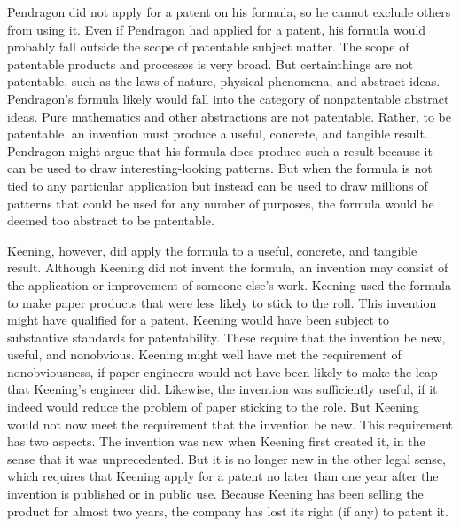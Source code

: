 \documentclass[
  ignorenonframetext,
  aspectratio=169]{beamer}
\begin{document}
\begin{frame}{}
\protect\hypertarget{section-12}{}
Pendragon did not apply for a patent on his formula, so he cannot
exclude others from using it. Even if Pendragon had applied for a
patent, his formula would probably fall outside the scope of patentable
subject matter. The scope of patentable products and processes is very
broad. But certainthings are not patentable, such as the laws of nature,
physical phenomena, and abstract ideas. Pendragon's formula likely would
fall into the category of nonpatentable abstract ideas. Pure mathematics
and other abstractions are not patentable. Rather, to be patentable, an
invention must produce a useful, concrete, and tangible result.
Pendragon might argue that his formula does produce such a result
because it can be used to draw interesting-looking patterns. But when
the formula is not tied to any particular application but instead can be
used to draw millions of patterns that could be used for any number of
purposes, the formula would be deemed too abstract to be patentable.
\end{frame}

\begin{frame}{}
\protect\hypertarget{section-13}{}
Keening, however, did apply the formula to a useful, concrete, and
tangible result. Although Keening did not invent the formula, an
invention may consist of the application or improvement of someone
else's work. Keening used the formula to make paper products that were
less likely to stick to the roll. This invention might have qualified
for a patent. Keening would have been subject to substantive standards
for patentability. These require that the invention be new, useful, and
nonobvious. Keening might well have met the requirement of
nonobviousness, if paper engineers would not have been likely to make
the leap that Keening's engineer did. Likewise, the invention was
sufficiently useful, if it indeed would reduce the problem of paper
sticking to the role. But Keening would not now meet the requirement
that the invention be new. This requirement has two aspects. The
invention was new when Keening first created it, in the sense that it
was unprecedented. But it is no longer new in the other legal sense,
which requires that Keening apply for a patent no later than one year
after the invention is published or in public use. Because Keening has
been selling the product for almost two years, the company has lost its
right (if any) to patent it.
\end{frame}
\end{document}
